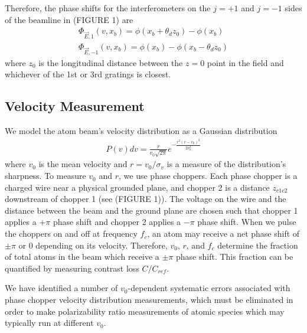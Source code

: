 \documentclass[twocolumn, prl,showpacs,superscriptaddress]{revtex4-1}   %
\begin{document}
Therefore, the phase shifts for the interferometers on the $j=+1$ and $j=-1$ sides of the beamline in (FIGURE 1) are
\begin{align}
	\Phi_{\vec{E},1}(v,x_b) = \phi(x_b+\theta_d z_0) - \phi(x_b) \nonumber \\
	\Phi_{\vec{E},-1}(v,x_b) = \phi(x_b) - \phi(x_b-\theta_d z_0)
	\label{deltaPhasePillars}
\end{align}
where $z_0$ is the longitudinal distance between the $z=0$ point in the field and whichever of the 1st or 3rd gratings is closest.

\subsection{Velocity Measurement}

We model the atom beam's velocity distribution as a Gaussian distribution
\begin{align}
	P(v)dv = \frac{r}{v_0\sqrt{2\pi}}e^{-\frac{r^2(v-v_0)^2}{2v_0^2}}
\end{align}
where $v_0$ is the mean velocity and $r = v_0/\sigma_v$ is a measure of the distribution's sharpness. To measure $v_0$ and $r$, we use phase choppers. Each phase chopper is a charged wire near a physical grounded plane, and chopper 2 is a distance $z_{c1c2}$ downstream of chopper 1 (see (FIGURE 1)). The voltage on the wire and the distance between the beam and the ground plane are chosen such that chopper 1 applies a $+\pi$ phase shift and chopper 2 applies a $-\pi$ phase shift. When we pulse the choppers on and off at frequency $f_c$, an atom may receive a net phase shift of $\pm\pi$ or $0$ depending on its velocity. Therefore, $v_0$, $r$, and $f_c$ determine the fraction of total atoms in the beam which receive a $\pm\pi$ phase shift. This fraction can be quantified by measuring contrast loss $C/C_{ref}$. 

We have identified a number of $v_0$-dependent systematic errors associated with phase chopper velocity distribution measurements, which must be eliminated in order to make polarizability ratio measurements of atomic species which may typically run at different $v_0$.
\end{document}
